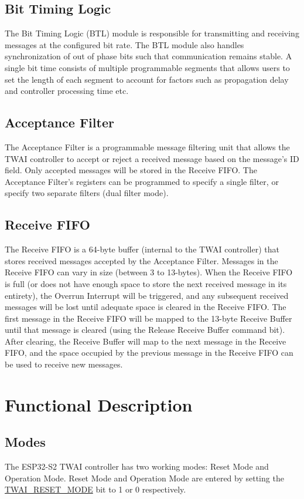 \documentclass[main\_\_EN.tex]{subfiles}
\begin{document}
\subsection{Bit Timing Logic}
The Bit Timing Logic (BTL) module is responsible for transmitting and receiving messages at the configured bit rate. The BTL module also handles synchronization of out of phase bits such that communication remains stable. A single bit time consists of multiple programmable segments that allows users to set the length of each segment to account for factors such as propagation delay and controller processing time etc.

\subsection{Acceptance Filter}
The Acceptance Filter is a programmable message filtering unit that allows the TWAI controller to accept or reject a received message based on the message’s ID field. Only accepted messages will be stored in the Receive FIFO. The Acceptance Filter’s registers can be programmed to specify a single filter, or specify two separate filters (dual filter mode).

\subsection{Receive FIFO}
The Receive FIFO is a 64-byte buffer (internal to the TWAI controller) that stores received messages accepted by the Acceptance Filter. Messages in the Receive FIFO can vary in size (between 3 to 13-bytes). When the Receive FIFO is full (or does not have enough space to store the next received message in its entirety), the Overrun Interrupt will be triggered, and any subsequent received messages will be lost until adequate space is cleared in the Receive FIFO. The first message in the Receive FIFO will be mapped to the 13-byte Receive Buffer until that message is cleared (using the Release Receive Buffer command bit). After clearing, the Receive Buffer will map to the next message in the Receive FIFO, and the space occupied by the previous message in the Receive FIFO can be used to receive new messages.

\section{Functional Description}

\subsection{Modes}
\label{subsubsec:modes}
The ESP32-S2 TWAI controller has two working modes: Reset Mode and Operation Mode. Reset Mode and Operation Mode are entered by setting the \hyperref[fielddesc:TWAIRESETMODE]{TWAI\_RESET\_MODE} bit to 1 or 0 respectively.
\end{document}
